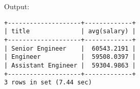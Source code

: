 \documentclass[12pt]{article}
\begin{document}
Output:

\begin{verbatim}
+--------------------+-------------+
| title              | avg(salary) |
+--------------------+-------------+
| Senior Engineer    |  60543.2191 |
| Engineer           |  59508.0397 |
| Assistant Engineer |  59304.9863 |
+--------------------+-------------+
3 rows in set (7.44 sec)
\end{verbatim}

\end{document}

